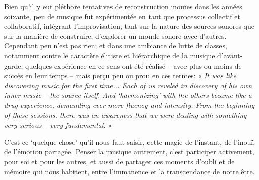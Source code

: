 \documentclass{article}
\begin{document}
Bien qu'il y eut pléthore tentatives de reconstruction inouïes dans les années soixante, peu de musique fut expérimentée en tant que processus collectif et collaboratif, intégrant l'improvisation, tant sur la nature des sources sonores que sur la manière de construire, d'explorer un monde sonore avec d'autres. Cependant peu n'est pas rien; et dans une ambiance de lutte de classes, notamment contre le caractère élitiste et hiérarchique de la musique d'avant-garde, 
quelques expérience en ce sens ont été réalisé -- avec plus ou moins de succès en leur temps -- mais perçu peu ou prou en ces termes:
 « \textsl{It was like discovering music for the first time... Each of us reveled in discovery of his own inner music -- the source itself. And `harmonizing' with the others became like a drug experience, demanding ever more fluency and intensity. From the beginning of these sessions, there was an awareness that we were dealing with something very serious – very fundamental.} »

C'est ce `quelque chose' qu'il nous faut saisir, cette magie de l'instant, de l'inouï, de l'émotion partagée. Penser la musique autrement, c'est participer activement, pour soi et pour les autres, et aussi de partager ces moments d'oubli et de mémoire qui nous habitent, entre l'immanence et la transcendance de notre être.


\end{document}
